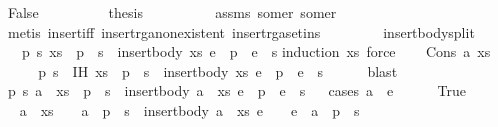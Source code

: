 \begin{isabellebody}
\ False\isanewline
\ \ \ \ \ \ \isamarkupfalse%
\ \isamarkupfalse%
\ {\isacharquery}thesis\isanewline
\ \ \ \ \ \ \ \ \isamarkupfalse%
\ assms\ some{\isacharunderscore}r{}\ some{\isacharunderscore}r{}\isanewline
\ \ \ \ \ \ \ \ \isamarkupfalse%
\ {\isacharparenleft}metis\ insert{\isacharunderscore}iff\ insert{\isacharunderscore}rga{\isacharunderscore}nonexistent\ insert{\isacharunderscore}rga{\isacharunderscore}set{\isacharunderscore}ins{\isacharparenright}\isanewline
\ \ \ \ \isamarkupfalse%
\isanewline
\ \ \isamarkupfalse%
\isanewline
{}\isamarkupfalse%
%
\endisatagproof
{\isafoldproof}%
%
\isadelimproof
\isanewline
%
\endisadelimproof
\isanewline
{}\isamarkupfalse%
\ insert{\isacharunderscore}body{\isacharunderscore}split{\isacharcolon}\isanewline
\ \ \ {\isachardoublequoteopen}{\isasymexists}p\ s{\isachardot}\ xs\ {\isacharequal}\ p\ {\isacharat}\ s\ {\isasymand}\ insert{\isacharunderscore}body\ xs\ e\ {\isacharequal}\ p\ {\isacharat}\ e\ {\isacharhash}\ s{\isachardoublequoteclose}\isanewline
%
\isadelimproof
%
\endisadelimproof
%
\isatagproof
{}\isamarkupfalse%
{\isacharparenleft}induction\ xs{\isacharcomma}\ force{\isacharparenright}\isanewline
\ \ \isamarkupfalse%
\ {\isacharparenleft}Cons\ a\ xs{\isacharparenright}\isanewline
\ \ \isamarkupfalse%
\ \isamarkupfalse%
\ p\ s\ \ IH{\isacharcolon}\ {\isachardoublequoteopen}xs\ {\isacharequal}\ p\ {\isacharat}\ s\ {\isasymand}\ insert{\isacharunderscore}body\ xs\ e\ {\isacharequal}\ p\ {\isacharat}\ e\ {\isacharhash}\ s{\isachardoublequoteclose}\isanewline
\ \ \ \ \isamarkupfalse%
\ blast\isanewline
\ \ \isamarkupfalse%
\ \isamarkupfalse%
\ {\isachardoublequoteopen}{\isasymexists}p\ s{\isachardot}\ a\ {\isacharhash}\ xs\ {\isacharequal}\ p\ {\isacharat}\ s\ {\isasymand}\ insert{\isacharunderscore}body\ {\isacharparenleft}a\ {\isacharhash}\ xs{\isacharparenright}\ e\ {\isacharequal}\ p\ {\isacharat}\ e\ {\isacharhash}\ s{\isachardoublequoteclose}\isanewline
\ \ \isamarkupfalse%
{\isacharparenleft}cases\ {\isachardoublequoteopen}a\ {\isacharless}\ e{\isachardoublequoteclose}{\isacharparenright}\isanewline
\ \ \ \ \isamarkupfalse%
\ True\isanewline
\ \ \ \ \isamarkupfalse%
\ \isamarkupfalse%
\ {\isachardoublequoteopen}a\ {\isacharhash}\ xs\ {\isacharequal}\ {\isacharbrackleft}{\isacharbrackright}\ {\isacharat}\ {\isacharparenleft}a\ {\isacharhash}\ p\ {\isacharat}\ s{\isacharparenright}\ {\isasymand}\ insert{\isacharunderscore}body\ {\isacharparenleft}a\ {\isacharhash}\ xs{\isacharparenright}\ e\ {\isacharequal}\ {\isacharbrackleft}{\isacharbrackright}\ {\isacharat}\ e\ {\isacharhash}\ {\isacharparenleft}a\ {\isacharhash}\ p\ {\isacharat}\ s{\isacharparenright}{\isachardoublequoteclose}\isanewline

\end{isabellebody}
